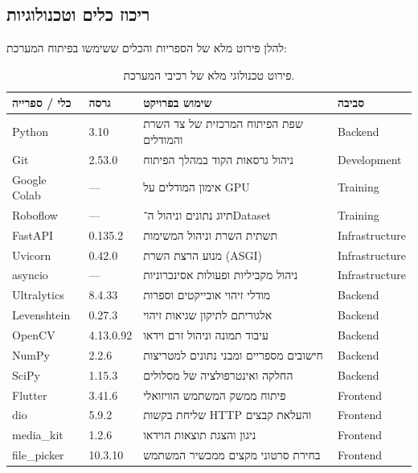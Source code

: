 \subsection{ריכוז כלים וטכנולוגיות} \label{app:tools}

להלן פירוט מלא של הספריות והכלים ששימשו בפיתוח המערכת:

\begin{table}[H]
  \centering
  \begin{tabular}{|p{}|p{}|p{}|p{}|}
    \hline
    \textbf{כלי / ספרייה} & \textbf{גרסה} & \textbf{שימוש בפרויקט} & \textbf{סביבה} \\ \hline
    \textenglish{Python} & 3.10 & שפת הפיתוח המרכזית של צד השרת והמודלים & \textenglish{Backend} \\ \hline
    \textenglish{Git} & 2.53.0 & ניהול גרסאות הקוד במהלך הפיתוח & \textenglish{Development} \\ \hline
    \textenglish{Google Colab} & --- & אימון המודלים על \textenglish{GPU} & \textenglish{Training} \\ \hline
    \textenglish{Roboflow} & --- & תיוג נתונים וניהול ה־\textenglish{Dataset} & \textenglish{Training} \\ \hline
    \textenglish{FastAPI} & 0.135.2 & תשתית השרת וניהול המשימות & \textenglish{Infrastructure} \\ \hline
    \textenglish{Uvicorn} & 0.42.0 & מנוע הרצת השרת (\textenglish{ASGI}) & \textenglish{Infrastructure} \\ \hline
    \textenglish{asyncio} & --- & ניהול מקביליות ופעולות אסינכרוניות & \textenglish{Infrastructure} \\ \hline
    \textenglish{Ultralytics} & 8.4.33 & מודלי זיהוי אובייקטים וספרות & \textenglish{Backend} \\ \hline
    \textenglish{Levenshtein} & 0.27.3 & אלגוריתם לתיקון שגיאות זיהוי & \textenglish{Backend} \\ \hline
    \textenglish{OpenCV} & 4.13.0.92 & עיבוד תמונה וניהול זרם וידאו & \textenglish{Backend} \\ \hline
    \textenglish{NumPy} & 2.2.6 & חישובים מספריים ומבני נתונים למטריצות & \textenglish{Backend} \\ \hline
    \textenglish{SciPy} & 1.15.3 & החלקה ואינטרפולציה של מסלולים & \textenglish{Backend} \\ \hline
    \textenglish{Flutter} & 3.41.6 & פיתוח ממשק המשתמש הוויזואלי & \textenglish{Frontend} \\ \hline
    \textenglish{dio} & 5.9.2 & שליחת בקשות \textenglish{HTTP} והעלאת קבצים & \textenglish{Frontend} \\ \hline
    \textenglish{media\_kit} & 1.2.6 & ניגון והצגת תוצאות הוידאו & \textenglish{Frontend} \\ \hline
    \textenglish{file\_picker} & 10.3.10 & בחירת סרטוני מקצים ממכשיר המשתמש & \textenglish{Frontend} \\ \hline
  \end{tabular}
  \caption{פירוט טכנולוגי מלא של רכיבי המערכת.}
  \label{tab:tools_full}
\end{table}

